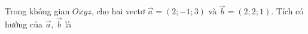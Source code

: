 \begin{ex}
Trong không gian $Oxyz$, cho hai vectơ $\vec a=(2;-1;3)$ và $\vec b=(2;2;1)$. Tích có hướng của $\vec a$, $\vec b$ là
\end{ex}
